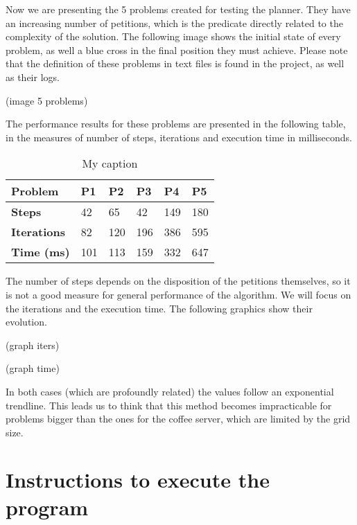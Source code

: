 \documentclass[12pt,a4paper,oneside]{article}
\numberwithin{equation}{section}
\numberwithin{equation}{section}
\theoremstyle{definition}
\begin{document}
Now we are presenting the 5 problems created for testing the planner. They have an increasing number of petitions, which is the predicate directly related to the complexity of the solution. The following image shows the initial state of every problem, as well a blue cross in the final position they must achieve. Please note that the definition of these problems in text files is found in the project, as well as their logs.

(image 5 problems)

The performance results for these problems are presented in the following table, in the measures of number of steps, iterations and execution time in milliseconds.

\begin{table}[]
	\centering
	\caption{My caption}
	\label{my-label}
	\begin{tabular}{llllll}
		\hline
		Problem             & \textbf{P1} & \textbf{P2} & \textbf{P3} & \textbf{P4} & \textbf{P5} \\ \hline
		\textbf{Steps}      & 42          & 65          & 42          & 149         & 180         \\
		\textbf{Iterations} & 82          & 120         & 196         & 386         & 595         \\
		\textbf{Time (ms)}  & 101         & 113         & 159         & 332         & 647         \\ \hline
	\end{tabular}
\end{table}

The number of steps depends on the disposition of the petitions themselves, so it is not a good measure for general performance of the algorithm. We will focus on the iterations and the execution time. The following graphics show their evolution.

(graph iters)

(graph time)

In both cases (which are profoundly related) the values follow an exponential trendline. This leads us to think that this method becomes impracticable for problems bigger than the ones for the coffee server, which are limited by the grid size.

\section{Instructions to execute the program}
\end{document}
